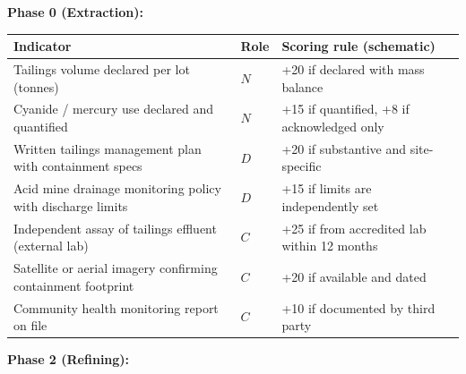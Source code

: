 \documentclass[12pt]{article}
\begin{document}
\textbf{Phase 0 (Extraction):}

\begin{longtable}[]{@{}
  >{\raggedright\arraybackslash}p{}
  >{\raggedright\arraybackslash}p{}
  >{\raggedright\arraybackslash}p{}@{}}
\toprule\noalign{}
\begin{minipage}[b]{\linewidth}\raggedright
Indicator
\end{minipage} & \begin{minipage}[b]{\linewidth}\raggedright
Role
\end{minipage} & \begin{minipage}[b]{\linewidth}\raggedright
Scoring rule (schematic)
\end{minipage} \\
\midrule\noalign{}
\endhead
\bottomrule\noalign{}
\endlastfoot
Tailings volume declared per lot (tonnes) & \(N\) & +20 if declared with
mass balance \\
Cyanide / mercury use declared and quantified & \(N\) & +15 if
quantified, +8 if acknowledged only \\
Written tailings management plan with containment specs & \(D\) & +20 if
substantive and site-specific \\
Acid mine drainage monitoring policy with discharge limits & \(D\) & +15
if limits are independently set \\
Independent assay of tailings effluent (external lab) & \(C\) & +25 if
from accredited lab within 12 months \\
Satellite or aerial imagery confirming containment footprint & \(C\) &
+20 if available and dated \\
Community health monitoring report on file & \(C\) & +10 if documented
by third party \\
\end{longtable}

\textbf{Phase 2 (Refining):}
\end{document}
